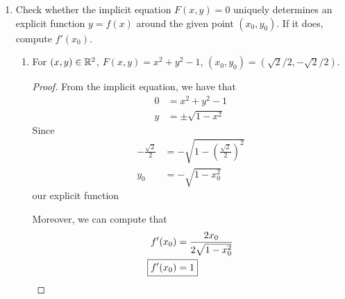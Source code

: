 \documentclass[../psets.tex]{subfiles}
\begin{document}
\begin{enumerate}
\begin{enumerate}
\begin{proof}
\begin{align*}
                &= 1+\int_0^t\frac{1}{1-t}\dd{t}\\
                \Aboxed{y_1(t) &= 1-\ln|1-t|}
            \end{align*}
            and
            \begin{align*}
                y_2(t) &= y_0(0)+\int_0^t\frac{y_1(t)}{1-t}\dd{t}\\
                &= 1+\int_0^t\frac{1-\ln|1-t|}{1-t}\dd{t}\\
                \Aboxed{y_2(t) &= 1-\ln|1-t|+\frac{1}{2}(\ln|1-t|)^2}
            \end{align*}
            The error between $y_2$ and the actual solution $y(t)=\e[-\ln|1-t|]$ is given by
            \begin{equation*}
                \boxed{\varepsilon = \e[-\ln|1-t|]-1+\ln|1-t|-\frac{1}{2}(\ln|1-t|)^2}
            \end{equation*}
        \end{proof}
    \end{enumerate}
    \pagebreak
    \item Check whether the implicit equation $F(x,y)=0$ uniquely determines an explicit function $y=f(x)$ around the given point $(x_0,y_0)$. If it does, compute $f'(x_0)$.
    \begin{enumerate}
        \item For $(x,y)\in\mathbb{R}^2$, $F(x,y)=x^2+y^2-1$, $(x_0,y_0)=(\sqrt{2}/2,-\sqrt{2}/2)$.
        \begin{proof}
            From the implicit equation, we have that
            \begin{align*}
                0 &= x^2+y^2-1\\
                y &= \pm\sqrt{1-x^2}
            \end{align*}
            Since
            \begin{align*}
                -\frac{\sqrt{2}}{2} &= -\sqrt{1-\left( \frac{\sqrt{2}}{2} \right)^2}\\
                y_0 &= -\sqrt{1-x_0^2}
            \end{align*}
            our explicit function \par
            Moreover, we can compute that
            \begin{align*}
                f'(x_0) &= \frac{2x_0}{2\sqrt{1-x_0^2}}\\
                \Aboxed{f'(x_0) &= 1}
            \end{align*}

\end{proof}
\end{enumerate}
\end{enumerate}
\end{document}
